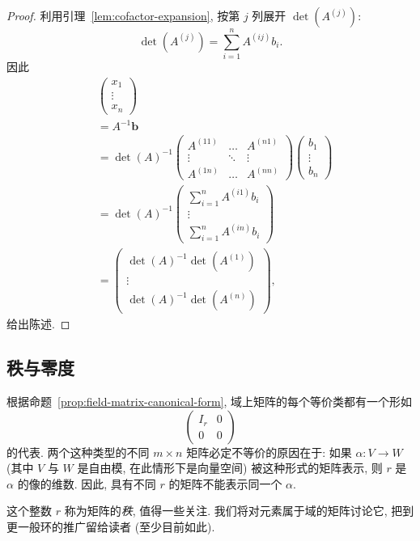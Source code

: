 \begin{proof}
利用引理~\ref{lem:cofactor-expansion}, 按第 $j$ 列展开 $\det(A^{(j)})$:
\[
\det(A^{(j)})=\sum_{i=1}^n A^{(ij)}b_i.
\]
因此
\[
\begin{aligned}
&\begin{pmatrix} x_1\\ \vdots\\ x_n\end{pmatrix}\\
&=A^{-1}\mathbf{b}\\
&=\det(A)^{-1}\begin{pmatrix} A^{(11)}&\dots&A^{(n1)}\\ \vdots&\ddots&\vdots\\ A^{(1n)}&\dots&A^{(nn)}\end{pmatrix}\begin{pmatrix} b_1\\ \vdots\\ b_n\end{pmatrix}\\
&=\det(A)^{-1}\begin{pmatrix} \sum_{i=1}^n A^{(i1)}b_i\\ \vdots\\ \sum_{i=1}^n A^{(in)}b_i\end{pmatrix}\\
&=\begin{pmatrix} \det(A)^{-1}\det(A^{(1)})\\ \vdots\\ \det(A)^{-1}\det(A^{(n)})\end{pmatrix},
\end{aligned}
\]
给出陈述.
\end{proof}

\subsection{秩与零度}
\label{subsec:rank-nullity}

根据命题~\ref{prop:field-matrix-canonical-form}, 域上矩阵的每个等价类都有一个形如
\[
\begin{pmatrix} I_r&0\\ \hline 0&0\end{pmatrix}
\]
的代表. 两个这种类型的不同 $m\times n$ 矩阵必定不等价的原因在于: 如果 $\alpha:V\to W$ (其中 $V$ 与 $W$ 是自由模, 在此情形下是向量空间) 被这种形式的矩阵表示, 则 $r$ 是 $\alpha$ 的像的维数. 因此, 具有不同 $r$ 的矩阵不能表示同一个 $\alpha$.

这个整数 $r$ 称为矩阵的\emph{秩}, 值得一些关注. 我们将对元素属于域的矩阵讨论它, 把到更一般环的推广留给读者 (至少目前如此).

